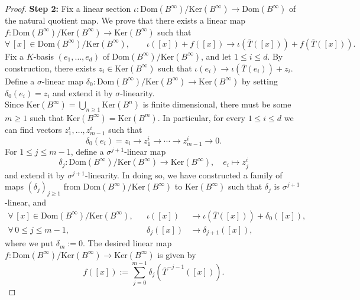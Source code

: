 \documentclass[12pt]{amsart}
\theoremstyle{definition}
\newcommand{\<}{\langle}   %
\renewcommand{\>}{\rangle} %
\begin{document}
\begin{proof}
\textbf{Step 2:} Fix a linear section $\iota:\mathrm{Dom}(B^{\infty})/\mathrm{Ker}(B^{\infty}) \to \mathrm{Dom}(B^{\infty})$ of the natural quotient map. We prove that there exists a linear map $f:\mathrm{Dom}(B^{\infty})/\mathrm{Ker}(B^{\infty}) \to \mathrm{Ker}(B^{\infty})$ such that 
\begin{equation*}
     \forall\, [x] \in \mathrm{Dom}(B^{\infty})/\mathrm{Ker}(B^{\infty}), \qquad \iota([x])+f([x]) \to \iota(\overline{T}([x])) + f(\overline{T}([x])).
\end{equation*}
Fix a $K$-basis $(e_1,\ldots,e_d)$ of $\mathrm{Dom}(B^{\infty})/\mathrm{Ker}(B^{\infty})$, and let $1 \leq i \leq d$. By construction, there exists $z_i \in \mathrm{Ker}(B^{\infty})$ such that $\iota(e_i) \to \iota(\overline{T}(e_i))+z_i$. Define a $\sigma$-linear map $\delta_0:\mathrm{Dom}(B^{\infty})/\mathrm{Ker}(B^{\infty})\to \mathrm{Ker}(B^{\infty})$ by setting $\delta_0(e_i) = z_i$ and extend it by $\sigma$-linearity.\\
Since $\mathrm{Ker}(B^{\infty}) = \bigcup_{n\geq 1}\mathrm{Ker}(B^n)$ is finite dimensional, there must be some $m \geq 1$ such that $\mathrm{Ker}(B^{\infty}) = \mathrm{Ker}(B^m)$. In particular, for every $1 \leq i \leq d$ we can find vectors $z^i_1,\ldots , z^i_{m-1}$ such that 
\begin{equation*}
    \delta_0(e_i)=z_i \to z^i_1 \to \cdots \to z^i_{m-1} \to 0.
\end{equation*}
For $1 \leq j \leq m-1$, define a $\sigma^{j+1}$-linear map 
\[ \delta_{j}:\mathrm{Dom}(B^{\infty})/\mathrm{Ker}(B^{\infty})\to \mathrm{Ker}(B^{\infty}), \quad e_i \mapsto z^i_j \] 
and extend it by $\sigma^{j+1}$-linearity. In doing so, we have constructed a family of maps $(\delta_j)_{j\geq 1}$ from $\mathrm{Dom}(B^{\infty})/\mathrm{Ker}(B^{\infty})$ to $\mathrm{Ker}(B^{\infty})$ such that $\delta_j$ is $\sigma^{j+1}$-linear, and
\begin{align*}
\forall\, [x]\in \mathrm{Dom}(B^{\infty})/\mathrm{Ker}(B^{\infty}), & & \iota([x]) & \to \iota(\overline{T}([x])) + \delta_0([x]),\\
\forall\, 0 \leq j \leq m-1, & & \delta_j([x]) & \to \delta_{j+1}([x]),
\end{align*}
where we put $\delta_{m} := 0$. The desired linear map $f:\mathrm{Dom}(B^{\infty})/\mathrm{Ker}(B^{\infty}) \to \mathrm{Ker}(B^{\infty})$ is given by
\begin{equation*}
    f([x]) := \sum_{j=0}^{m-1} \delta_j(\overline{T}^{-j-1}([x])).
\end{equation*}

\end{proof}
\end{document}
